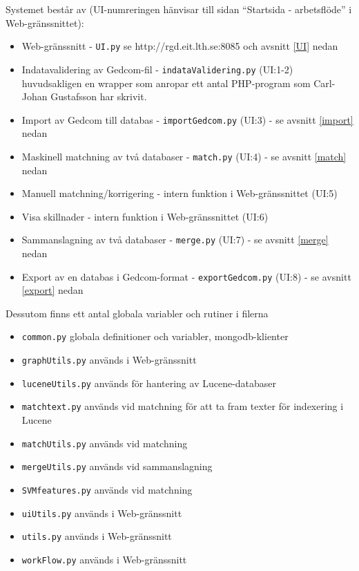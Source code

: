 \documentclass[swedish,11pt]{article}
\begin{document}
Systemet består av (UI-numreringen hänvisar till sidan ``Startsida -
arbetsflöde'' i Web-gränssnittet):
\begin{itemize}
\item Web-gränssnitt - \verb+UI.py+  se http://rgd.eit.lth.se:8085 och avsnitt \ref{UI} nedan
\item Indatavalidering av Gedcom-fil - \verb+indataValidering.py+
  (UI:1-2)\\
huvudsakligen en wrapper som anropar ett antal PHP-program som
Carl-Johan Gustafsson har skrivit.
\item Import av Gedcom till databas - \verb+importGedcom.py+ (UI:3) - se
  avsnitt \ref{import} nedan
\item Maskinell matchning av två databaser - \verb+match.py+ (UI:4) - se
  avsnitt \ref{match} nedan
\item Manuell matchning/korrigering - intern funktion i
  Web-gränssnittet (UI:5)
\item Visa skillnader - intern funktion i
  Web-gränssnittet (UI:6)
\item Sammanslagning av två databaser - \verb+merge.py+ (UI:7) - se
  avsnitt \ref{merge} nedan
\item Export av en databas i Gedcom-format - \verb+exportGedcom.py+
  (UI:8) - se avsnitt \ref{export} nedan
\end{itemize}

Dessutom finns ett antal globala variabler och rutiner i filerna
\begin{itemize}
\item \verb+common.py+ globala definitioner och variabler, mongodb-klienter
\item \verb+graphUtils.py+ används i Web-gränssnitt 
\item \verb+luceneUtils.py+ används för hantering av Lucene-databaser
\item \verb+matchtext.py+ används vid matchning för att ta fram texter
  för indexering i Lucene
\item \verb+matchUtils.py+ används vid matchning
\item \verb+mergeUtils.py+ används vid sammanslagning
\item \verb+SVMfeatures.py+ används vid matchning
\item \verb+uiUtils.py+ används i Web-gränssnitt 
\item \verb+utils.py+ används i Web-gränssnitt 
\item \verb+workFlow.py+ används i Web-gränssnitt 
\end{itemize}
\end{document}
